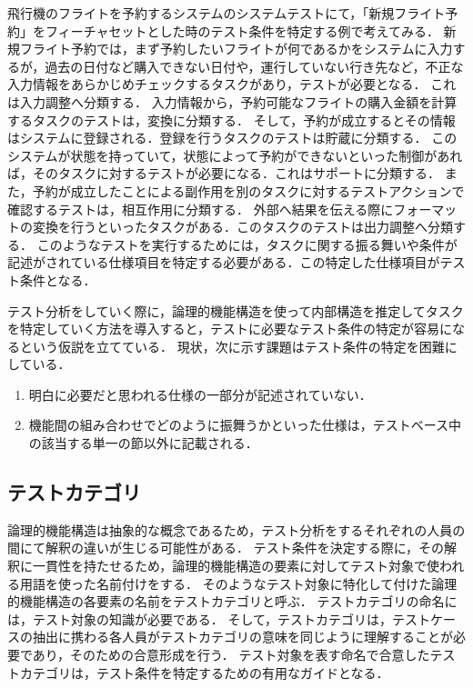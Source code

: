 飛行機のフライトを予約するシステムのシステムテストにて，「新規フライト予約」をフィーチャセットとした時のテスト条件を特定する例で考えてみる．
新規フライト予約では，まず予約したいフライトが何であるかをシステムに入力するが，過去の日付など購入できない日付や，運行していない行き先など，不正な入力情報をあらかじめチェックするタスクがあり，テストが必要となる．
これは入力調整へ分類する．
入力情報から，予約可能なフライトの購入金額を計算するタスクのテストは，変換に分類する．
そして，予約が成立するとその情報はシステムに登録される．登録を行うタスクのテストは貯蔵に分類する．
このシステムが状態を持っていて，状態によって予約ができないといった制御があれば，そのタスクに対するテストが必要になる．これはサポートに分類する．
また，予約が成立したことによる副作用を別のタスクに対するテストアクションで確認するテストは，相互作用に分類する．
外部へ結果を伝える際にフォーマットの変換を行うといったタスクがある．このタスクのテストは出力調整へ分類する．
このようなテストを実行するためには，タスクに関する振る舞いや条件が記述がされている仕様項目を特定する必要がある．この特定した仕様項目がテスト条件となる．


テスト分析をしていく際に，論理的機能構造を使って内部構造を推定してタスクを特定していく方法を導入すると，テストに必要なテスト条件の特定が容易になるという仮説を立てている．
現状，次に示す課題はテスト条件の特定を困難にしている．

\begin{enumerate}
\item 明白に必要だと思われる仕様の一部分が記述されていない．
\item 機能間の組み合わせでどのように振舞うかといった仕様は，テストベース中の該当する単一の節以外に記載される．
\end{enumerate}

\subsection{テストカテゴリ}
論理的機能構造は抽象的な概念であるため，テスト分析をするそれぞれの人員の間にて解釈の違いが生じる可能性がある．
テスト条件を決定する際に，その解釈に一貫性を持たせるため，論理的機能構造の要素に対してテスト対象で使われる用語を使った名前付けをする．
そのようなテスト対象に特化して付けた論理的機能構造の各要素の名前をテストカテゴリと呼ぶ．
テストカテゴリの命名には，テスト対象の知識が必要である．
そして，テストカテゴリは，テストケースの抽出に携わる各人員がテストカテゴリの意味を同じように理解することが必要であり，そのための合意形成を行う．
テスト対象を表す命名で合意したテストカテゴリは，テスト条件を特定するための有用なガイドとなる．


